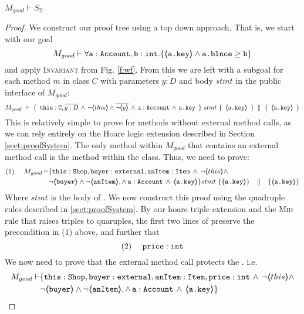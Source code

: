\begin{lemma}
$M_{good} \vdash S_2$
\end{lemma}
\begin{proof}
We construct our proof tree using a top down approach.  That is, we start with our goal
$$M_{good} \vdash \forall {\mbox{\normalfont{\texttt{a}}}:\mbox{\normalfont{\texttt{Account}}}, \mbox{\normalfont{\texttt{b}}} : \mbox{\normalfont{\texttt{int}}}}.{{\{}}{\langle\!\!\langle \mbox{\normalfont{\texttt{a.key}}} \rangle\!\!\rangle \wedge \mbox{\normalfont{\texttt{a.blnce}}} \geq \mbox{\normalfont{\texttt{b}}}}{{\}}}$$
and apply  \textsc{Invariant} from Fig. \ref{f:wf}.
From this we are left with a subgoal for each method $m$ in  class $C$ with parameters $\overline{y:D}$ and body $stmt$ in the public interface of $M_{good}$:
\small
$$\hprovesN{M_{good}} { \ \prg{this}:\prg{C}, \overline{y:D}\, \wedge\, \neg\inside{this}\wedge\overline{ \neg\inside{y}}\, \wedge\, \prg{a} : \prg{Account}\, \wedge\,  \prg{a.key}\  } {\ stmt\ } {\ \inside{\prg{a.key}}\ } {\ \inside{\prg{a.key}} \ } $$
\normalsize
This is relatively simple to prove for methods without external method calls, as we can rely entirely on the Hoare logic extension described in Section \ref{sect:proofSystem}. The only  method within $M_{good}$ that contains 
an external method call is  the  method within the  class. Thus, we need to prove:
\small
\begin{align*}
\text{(1)} \ \ \ \ M_{good} \vdash & \{  \prg{this}:\prg{Shop}, \prg{buyer} : \prg{external}, \prg{anItem} : \prg{Item} \, \wedge\, \neg\inside{this}\wedge \\ 
		&\neg\inside{\prg{buyer}} \wedge \neg\inside{\prg{anItem}}, \wedge\, \prg{a} : \prg{Account}\, \wedge\,  \inside{\prg{a.key}} \} 
		 stmt\ \{ \inside{\prg{a.key}} \} \ \ \  || \ \ \ \{ \inside{\prg{a.key}} \}
\end{align*}
\normalsize
Where $stmt$ is the body of . We now construct this proof using the quadruple rules described in \ref{sect:proofSystem}. By our hoare triple extension and the \textsc{Mid} rule that raises triples to quaruples, the first two lines
of  preserve the precondition in (1) above, and further that 
\small
$$
\text{(2)} \ \ \ \ \mbox{\normalfont{\texttt{price}}} : \mbox{\normalfont{\texttt{int}}}
$$ 
We now need to prove that the external method call  protects the . i.e.
\small
\begin{align*}
M_{good} \vdash & \{  \prg{this}:\prg{Shop}, \prg{buyer} : \prg{external}, \prg{anItem} : \prg{Item}, \prg{price} : \prg{int} \, \wedge\, \neg\inside{this}\wedge \\ 
		&\neg\inside{\prg{buyer}} \wedge \neg\inside{\prg{anItem}}, \wedge\, \prg{a} : \prg{Account}\, \wedge\,  \inside{\prg{a.key}} \}  \\

\end{align*}
\end{proof}

